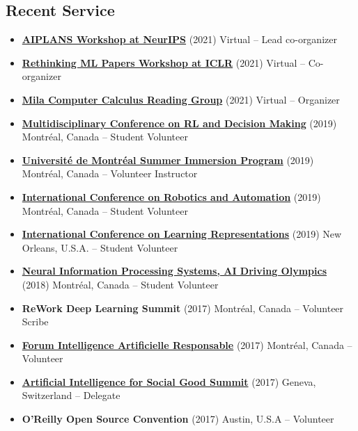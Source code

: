 \documentclass[letterpaper,11pt]{article}
\newcommand{\resumeItem}[2]{
  \item\small{\textbf{#1}{ #2 }}
}
\newcommand{\resumeSubItem}[2]{\resumeItem{#1}{#2}}
\newcommand{\resumeSubHeadingListStart}{\begin{itemize}[leftmargin=*]}
\newcommand{\resumeSubHeadingListEnd}{\end{itemize}}
\begin{document}
\begin{justify}
\section{Recent Service}
\resumeSubHeadingListStart
\resumeSubItem{\href{https://aiplans.github.io/}{AIPLANS Workshop at NeurIPS}}{(2021) Virtual -- Lead co-organizer}
\resumeSubItem{\href{https://rethinkingmlpapers.github.io/}{Rethinking ML Papers Workshop at ICLR}}{(2021) Virtual -- Co-organizer}
\resumeSubItem{\href{https://compcalc.github.io/}{Mila Computer Calculus Reading Group}}{(2021) Virtual -- Organizer}
\resumeSubItem{\href{http://rldm.org/}{Multidisciplinary Conference on RL and Decision Making}}{(2019) Montr\'eal, Canada -- Student Volunteer}
\resumeSubItem{\href{https://admission.umontreal.ca/en/summer-immersion-program/a-summer-in-montreal/}{Universit\'e de Montr\'eal Summer Immersion Program}}{(2019) Montr\'eal, Canada -- Volunteer Instructor}
\resumeSubItem{\href{https://www.icra2019.org/}{International Conference on Robotics and Automation}}{(2019)  Montr\'eal, Canada -- Student Volunteer}
\resumeSubItem{\href{https://iclr.cc/Conferences/2019}{International Conference on Learning Representations}}{(2019) New Orleans, U.S.A. -- Student Volunteer}
\resumeSubItem{\href{https://www.duckietown.org/research/ai-driving-olympics}{Neural Information Processing Systems, AI Driving Olympics}}{(2018) Montr\'eal, Canada -- Student Volunteer}
\resumeSubItem{ReWork Deep Learning Summit}{(2017) Montr\'eal, Canada -- Volunteer Scribe}
\resumeSubItem{\href{https://sites.grenadine.co/sites/forumiaresponsableumontreal/fr/forumiaresponsableumontreal}{Forum Intelligence Artificielle Responsable}}{(2017) Montr\'eal, Canada -- Volunteer}
\resumeSubItem{\href{https://aiforgood.itu.int/}{Artificial Intelligence for Social Good Summit}}{(2017) Geneva, Switzerland -- Delegate}
\resumeSubItem{O'Reilly Open Source Convention}{(2017) Austin, U.S.A -- Volunteer}
\resumeSubHeadingListEnd


\end{justify}
\end{document}
